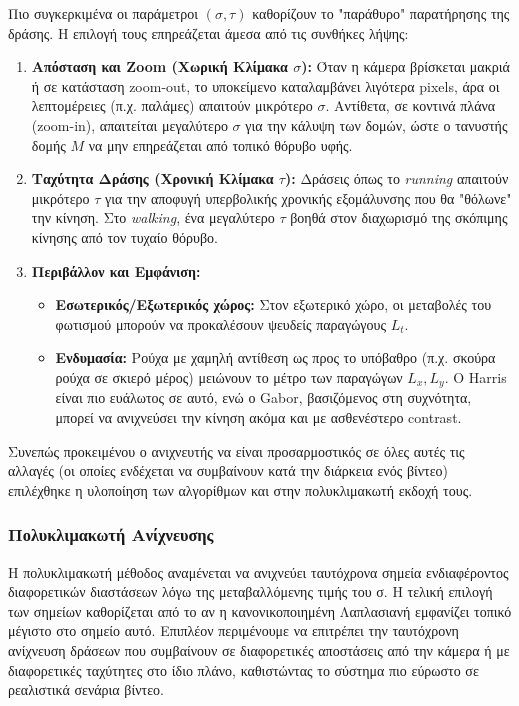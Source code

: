 \documentclass[12pt]{article}
\begin{document}
Πιο συγκερκιμένα οι παράμετροι $(\sigma, \tau)$ καθορίζουν το "παράθυρο" παρατήρησης της δράσης. Η επιλογή τους επηρεάζεται άμεσα από τις συνθήκες λήψης:

\begin{enumerate}
    \item \textbf{Απόσταση και Zoom (Χωρική Κλίμακα $\sigma$):} Όταν η κάμερα βρίσκεται μακριά ή σε κατάσταση zoom-out, το υποκείμενο καταλαμβάνει λιγότερα pixels, άρα οι λεπτομέρειες (π.χ. παλάμες) απαιτούν μικρότερο $\sigma$. Αντίθετα, σε κοντινά πλάνα (zoom-in), απαιτείται μεγαλύτερο $\sigma$ για την κάλυψη των δομών, ώστε ο τανυστής δομής $M$ να μην επηρεάζεται από τοπικό θόρυβο υφής.
    \item \textbf{Ταχύτητα Δράσης (Χρονική Κλίμακα $\tau$):} Δράσεις όπως το \textit{running} απαιτούν μικρότερο $\tau$ για την αποφυγή υπερβολικής χρονικής εξομάλυνσης που θα "θόλωνε" την κίνηση. Στο \textit{walking}, ένα μεγαλύτερο $\tau$ βοηθά στον διαχωρισμό της σκόπιμης κίνησης από τον τυχαίο θόρυβο.
    \item \textbf{Περιβάλλον και Εμφάνιση:} 
    \begin{itemize}
        \item \textbf{Εσωτερικός/Εξωτερικός χώρος:} Στον εξωτερικό χώρο, οι μεταβολές του φωτισμού μπορούν να προκαλέσουν ψευδείς παραγώγους $L_t$.
        \item \textbf{Ενδυμασία:} Ρούχα με χαμηλή αντίθεση ως προς το υπόβαθρο (π.χ. σκούρα ρούχα σε σκιερό μέρος) μειώνουν το μέτρο των παραγώγων $L_x, L_y$. Ο Harris είναι πιο ευάλωτος σε αυτό, ενώ ο Gabor, βασιζόμενος στη συχνότητα, μπορεί να ανιχνεύσει την κίνηση ακόμα και με ασθενέστερο contrast.
    \end{itemize}
\end{enumerate}

Συνεπώς προκειμένου ο ανιχνευτής να είναι προσαρμοστικός σε όλες αυτές τις αλλαγές (οι οποίες ενδέχεται να συμβαίνουν κατά την διάρκεια ενός βίντεο) επιλέχθηκε η υλοποίηση των αλγορίθμων και στην πολυκλιμακωτή εκδοχή τους.

\subsubsection*{Πολυκλιμακωτή Ανίχνευσης}
Η πολυκλιμακωτή μέθοδος αναμένεται να ανιχνεύει ταυτόχρονα σημεία ενδιαφέροντος διαφορετικών διαστάσεων λόγω της μεταβαλλόμενης τιμής του σ. Η τελική επιλογή των σημείων καθορίζεται από το αν  η κανονικοποιημένη Λαπλασιανή εμφανίζει τοπικό μέγιστο στο σημείο αυτό. Επιπλέον περιμένουμε να επιτρέπει την ταυτόχρονη ανίχνευση δράσεων που συμβαίνουν σε διαφορετικές αποστάσεις από την κάμερα ή με διαφορετικές ταχύτητες στο ίδιο πλάνο, καθιστώντας το σύστημα πιο εύρωστο σε ρεαλιστικά σενάρια βίντεο.
\end{document}

